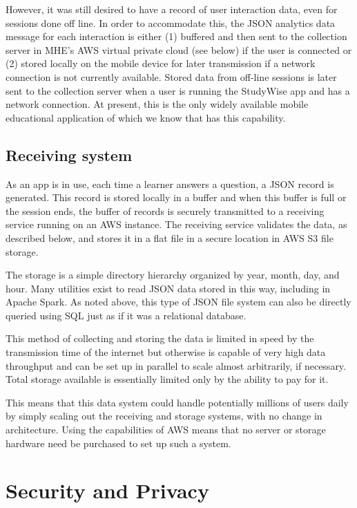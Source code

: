 \documentclass[runningheads,a4paper]{llncs}
\begin{document}
However, it was still desired to have a record of user interaction data, even for sessions done off line.  In order to accommodate this, the JSON analytics data message for each interaction is either (1) buffered and then sent to the collection server in MHE's AWS virtual private cloud (see below) if the user is connected or (2) stored locally on the mobile device for later transmission if a network connection is not currently available.  Stored data from off-line sessions is later sent to the collection server when a user is running the StudyWise app and has a network connection.  At present, this is the only widely available mobile educational application of which we know that has this capability.

\subsection{Receiving system}

As an app is in use, each time a learner answers a question, a JSON record is generated.  This record is stored locally in a buffer and when this buffer is full or the session ends, the buffer of records is securely transmitted to a receiving service running on an AWS instance.  The receiving service validates the data, as described below, and stores it in a flat file in a secure location in AWS S3 file storage.

The storage is a simple directory hierarchy organized by year, month, day, and hour.  Many utilities exist to read JSON data stored in this way, including  in Apache Spark.  As noted above, this type of JSON file system can also be directly queried using SQL just as if it was a relational database.

This method of collecting and storing the data is limited in speed by the transmission time of the internet but otherwise is capable of very high data throughput and can be set up in parallel to scale almost arbitrarily, if necessary.  Total storage available is essentially limited only by the ability to pay for it.

This means that this data system could handle potentially millions of users daily by simply scaling out the receiving and storage systems, with no change in architecture.  Using the capabilities of AWS means that no server or storage hardware need be purchased to set up such a system.

\section{Security and Privacy} 
\end{document}
